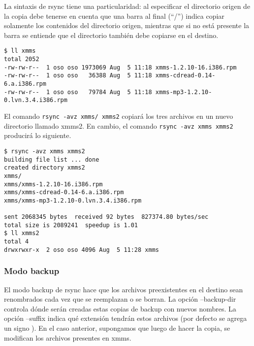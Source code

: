 La sintaxis de rsync tiene una particularidad: al especificar el directorio origen de la copia debe tenerse en cuenta que una barra al final (“/”) indica copiar solamente los contenidos del directorio origen, mientras que si no está presente la barra se entiende que el directorio también debe copiarse en el destino. 

\begin{lstlisting}
$ ll xmms
total 2052
-rw-rw-r--  1 oso oso 1973069 Aug  5 11:18 xmms-1.2.10-16.i386.rpm
-rw-rw-r--  1 oso oso   36388 Aug  5 11:18 xmms-cdread-0.14-6.a.i386.rpm
-rw-rw-r--  1 oso oso   79784 Aug  5 11:18 xmms-mp3-1.2.10-0.lvn.3.4.i386.rpm
\end{lstlisting}

El comando \lstinline$rsync -avz xmms/ xmms2$ copiará los tres archivos en un nuevo directorio llamado xmms2. En cambio, el comando \lstinline$rsync -avz xmms xmms2$ producirá lo siguiente.

\begin{lstlisting}
$ rsync -avz xmms xmms2
building file list ... done
created directory xmms2
xmms/
xmms/xmms-1.2.10-16.i386.rpm
xmms/xmms-cdread-0.14-6.a.i386.rpm
xmms/xmms-mp3-1.2.10-0.lvn.3.4.i386.rpm

sent 2068345 bytes  received 92 bytes  827374.80 bytes/sec
total size is 2089241  speedup is 1.01
$ ll xmms2
total 4
drwxrwxr-x  2 oso oso 4096 Aug  5 11:28 xmms
\end{lstlisting}

\subsubsection{Modo backup}
El modo backup de rsync hace que los archivos preexistentes en el destino sean renombrados cada vez que se reemplazan o se borran. La opción --backup-dir controla dónde serán creadas estas copias de backup con nuevos nombres. La opción --suffix indica qué extensión tendrán estos archivos (por defecto se agrega un signo \quotes{\textasciitilde}).
En el caso anterior, supongamos que luego de hacer la copia, se modifican los archivos presentes en xmms.

